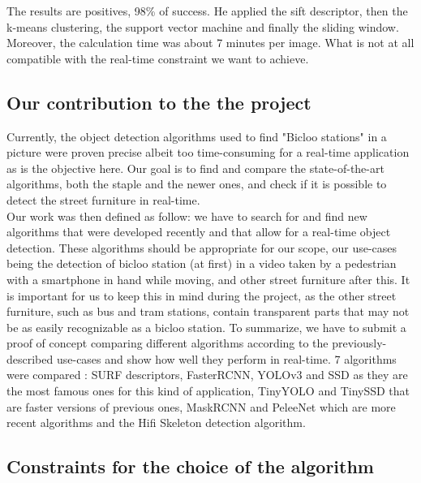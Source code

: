 \documentclass[10pt]{article}
\begin{document}
The results are positives, 98\% of success. He applied the sift descriptor, then the k-means clustering, the support vector machine and finally the sliding window. Moreover, the calculation time was about 7 minutes per image. What is not at all compatible with the real-time constraint we want to achieve.

    \subsection{Our contribution to the the project}

Currently, the object detection algorithms used to find "Bicloo stations" in a picture were proven precise albeit too time-consuming for a real-time application as is the objective here. Our goal is to find and compare the state-of-the-art algorithms, both the staple and the newer ones, and check if it is possible to detect the street furniture in real-time.\\

Our work was then defined as follow: we have to search for and find new algorithms that were developed recently and that allow for a real-time object detection. These algorithms should be appropriate for our scope, our use-cases being the detection of bicloo station (at first) in a video taken by a pedestrian with a smartphone in hand while moving, and other street furniture after this. 
It is important for us to keep this in mind during the project, as the other street furniture, such as bus and tram stations, contain transparent parts that may not be as easily recognizable as a bicloo station. To summarize, we have to submit a proof of concept comparing different algorithms according to the previously-described use-cases and show how well they perform in real-time.
7 algorithms were compared : SURF descriptors\cite{bay2006surf}, FasterRCNN\cite{FasterRCNN}, YOLOv3\cite{redmon2017yolo9000} and SSD\cite{liu2016ssd} as they are the most famous ones for this kind of application, TinyYOLO\cite{tfjs-yolo-tiny} and TinySSD\cite{wong2018tiny} that are faster versions of previous ones, MaskRCNN\cite{he2017mask} and PeleeNet\cite{wang2018pelee} which are more recent algorithms and the Hifi Skeleton detection algorithm.  \\

\subsection{Constraints for the choice of the algorithm}
\end{document}
